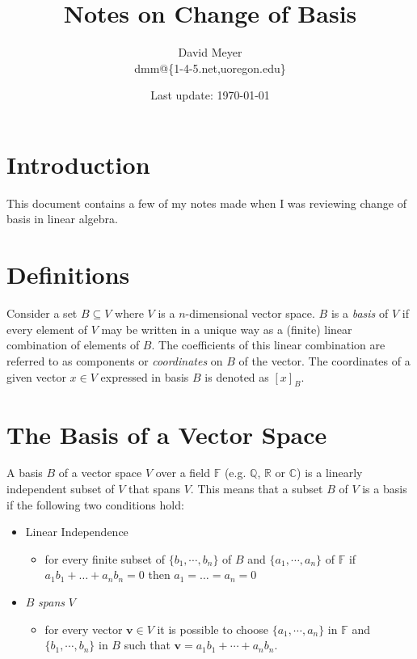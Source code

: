 \documentclass[11pt, oneside]{article}   	%
\title{Notes on Change of Basis}
\author{David Meyer \\ dmm@\{1-4-5.net,uoregon.edu\}}
\date{Last update: \today}							%
\begin{document}
\maketitle


\section{Introduction}
This document contains a few of my notes made when I was reviewing change of basis in linear algebra.

\section{Definitions}
Consider a set $B \subseteq V$ where $V$ is a $n$-dimensional vector space. $B$ is a \emph{basis} of $V$ if every element of 
$V$ may be written in a unique way as a (finite) linear combination of elements of $B$. The coefficients of this linear combination 
are referred to as components or \emph{coordinates} on $B$ of the vector. The coordinates of a given vector $x \in V$ expressed in 
basis $B$ is denoted as $[x]_B$.

\section{The Basis of a Vector Space}
\label{sub:basis_vectors}
A basis $B$ of a vector space $V$ over a field $\mathbb{F}$ (e.g. $\mathbb{Q}$, $\mathbb{R}$ or $\mathbb{C}$) is a linearly independent subset of $V$
that spans $V$. This means that a subset $B$ of $V$ is a basis if the following two conditions hold:

\begin{itemize}
\item Linear Independence
\begin{itemize}
\item for every finite subset of  $\{b_1, \cdots, b_n\}$ of $B$ and $\{a_1, \cdots, a_n\} $ of $\mathbb{F}$ if  \\
$a_1b_1 +  \hdots + a_nb_n = 0$ then $a_1 = \hdots = a_n = 0$
\end{itemize}
\item $B$ \emph{spans} $V$
\begin{itemize}
\item for every vector $\mathbf{v} \in V$ it is possible to choose $\{a_1, \cdots,  a_n\}$ in $\mathbb{F}$ and \\
$\{b_1,  \cdots, b_n\}$ in $B$ such that $\mathbf{v} = a_1b_1 + \cdots +  a_nb_n$. 
\end{itemize}
\end{itemize}
\end{document}
